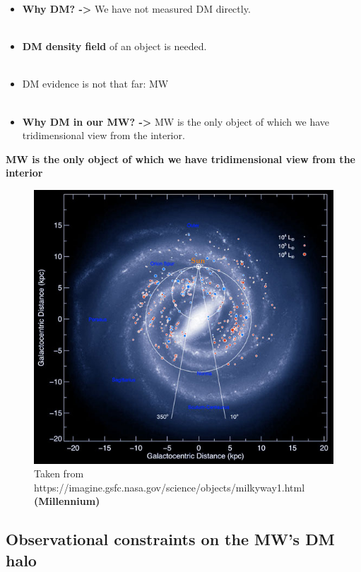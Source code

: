 \documentclass[xcolor=dvipsnames]{beamer}
\begin{document}
\begin{frame}
\large
\begin{itemize}
\small
\item \textbf{Why DM? ->} We have not measured DM directly.\\~\\
\item \textbf{DM density field} of an object is needed.\\~\\
\item DM evidence is not that far: MW\\~\\
\item \textbf{Why DM in our MW? -> }MW is the only object of which we have tridimensional view from the interior.
\end{itemize}
\normalsize
\end{frame}

\begin{frame}
\centering
\large
\textbf{MW is the only object of which we have tridimensional view from the interior}

\begin{figure}
\includegraphics[width=0.55\linewidth]{./pics/MW.jpg}
\caption{\tiny Taken from https://imagine.gsfc.nasa.gov/science/objects/milkyway1.html \textbf{(Millennium)}}
\end{figure}
\end{frame}

\subsection{Observational constraints on the MW's DM halo}
\end{document}
